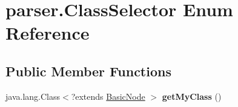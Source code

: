 \hypertarget{enumparser_1_1_class_selector}{}\section{parser.\+Class\+Selector Enum Reference}
\label{enumparser_1_1_class_selector}
\subsection*{Public Member Functions}
\begin{DoxyCompactItemize}
\item 
java.\+lang.\+Class$<$?extends \hyperlink{classparser_1_1_basic_node}{Basic\+Node} $>$ {\bfseries get\+My\+Class} ()\hypertarget{enumparser_1_1_class_selector_abaacc322e4802c475e8fafaf442f85f5}{}\label{enumparser_1_1_class_selector_abaacc322e4802c475e8fafaf442f85f5}

\end{DoxyCompactItemize}

